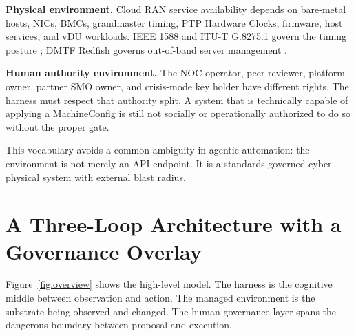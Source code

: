 \documentclass[twocolumn,10pt,a4paper]{article}
\begin{document}
\textbf{Physical environment.} Cloud RAN service availability depends on bare-metal hosts, NICs, BMCs, grandmaster timing, PTP Hardware Clocks, firmware, host services, and vDU workloads. IEEE 1588 and ITU-T G.8275.1 govern the timing posture \cite{ieee_1588_2019,itu_g82751}; DMTF Redfish governs out-of-band server management \cite{dmtf_redfish}.

\textbf{Human authority environment.} The NOC operator, peer reviewer, platform owner, partner SMO owner, and crisis-mode key holder have different rights. The harness must respect that authority split. A system that is technically capable of applying a MachineConfig is still not socially or operationally authorized to do so without the proper gate.

This vocabulary avoids a common ambiguity in agentic automation: the environment is not merely an API endpoint. It is a standards-governed cyber-physical system with external blast radius.

\section{A Three-Loop Architecture with a Governance Overlay}
\label{sec:loops}

Figure~\ref{fig:overview} shows the high-level model. The harness is the cognitive middle between observation and action. The managed environment is the substrate being observed and changed. The human governance layer spans the dangerous boundary between proposal and execution.
\end{document}
